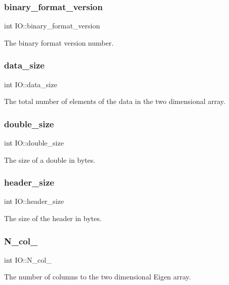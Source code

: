 \subsubsection{\texorpdfstring{binary\_format\_version}{binary\_format\_version}}
{\footnotesize\ttfamily int I\+O\+::binary\+\_\+format\+\_\+version}

The binary format version number. \mbox{\label{class_i_o_a39a8a0474a288522d847f6be0fb2403f}} 
\subsubsection{\texorpdfstring{data\_size}{data\_size}}
{\footnotesize\ttfamily int I\+O\+::data\+\_\+size}

The total number of elements of the data in the two dimensional array. \mbox{\label{class_i_o_a3af3bf77eacd18c1c50cbf78b46c4228}} 
\subsubsection{\texorpdfstring{double\_size}{double\_size}}
{\footnotesize\ttfamily int I\+O\+::double\+\_\+size}

The size of a double in bytes. \mbox{\label{class_i_o_aee540c40b18d5f9990bf8d7e12cb0827}} 
\subsubsection{\texorpdfstring{header\_size}{header\_size}}
{\footnotesize\ttfamily int I\+O\+::header\+\_\+size}

The size of the header in bytes. \mbox{\label{class_i_o_a64aae2d2be35348233f8ddac4d6791f2}} 
\subsubsection{\texorpdfstring{N\_col\_}{N\_col\_}}
{\footnotesize\ttfamily int I\+O\+::\+N\+\_\+col\+\_\+}

The number of columns to the two dimensional Eigen array. \mbox{\label{class_i_o_ab8aa1490df2e2e758766030afdae3a40}} 
